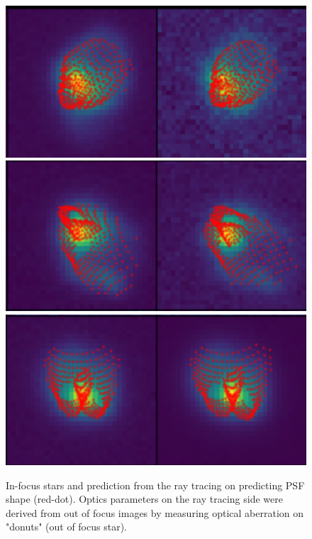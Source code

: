 \begin{figure}
        \centering
        \includegraphics[scale=0.47]{figures/plot_psf_1}
        \includegraphics[scale=0.47]{figures/plot_psf_2}
        \includegraphics[scale=0.47]{figures/plot_psf_3}
        \caption{\small In-focus stars and prediction from the ray tracing on predicting PSF shape (red-dot). Optics parameters on the ray tracing side were derived from out of focus images by measuring optical aberration on "donuts" (out of focus star).}
        \label{PSF_plot}
\end{figure}